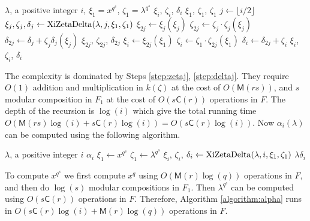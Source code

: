 \documentclass[12pt]{article}
\theoremstyle{plain}
\theoremstyle{definition}
\def\MM{\ensuremath{\mathsf{M}}}
\def\CC{\ensuremath{\mathsf{C}}}
\newcounter{algorithm}
\begin{document}
\begin{algorithm}
	\label{algorithm:xizetadelta}
	\begin{algorithmic}[1]
		\REQUIRE $\lambda$, a positive integer $i$, $\xi_1=x^{q^s}$, $\zeta_1=\lambda^{q^s}$
		\ENSURE $\xi_i$, $\zeta_i$, $\delta_i$
		\RETURN $\xi_1$, $\zeta_1$, $\zeta_1$
		\ENDIF
		\STATE $j \leftarrow \lfloor i/2\rfloor$
		\STATE $\xi_{j},\zeta_{j},\delta_j \leftarrow {\rm XiZetaDelta}(\lambda,j,\xi_1,\zeta_1)$ 
		\STATE $\xi_{2j} \leftarrow \xi_j(\xi_j)$
		\STATE\label{step:zetaj} $\zeta_{2j} \leftarrow \zeta_j\cdot \zeta_j(\xi_j)$
		\STATE\label{step:deltaj} $\delta_{2j}\leftarrow \delta_j+\zeta_j \delta_j(\xi_j)$
		\RETURN $\xi_{2j}$, $\zeta_{2j}$, $\delta_{2j}$
		\ENDIF
		\STATE $\xi_i \leftarrow \xi_{2j}(\xi_1)$
		\STATE $\zeta_i \leftarrow \zeta_1\cdot \zeta_{2j}(\xi_1)$
		\STATE $\delta_i \leftarrow \delta_{2j}+\zeta_i$
		\RETURN $\xi_i$, $\zeta_i$, $\delta_i$
	\end{algorithmic}
\end{algorithm}
The complexity is dominated by Steps \ref{step:zetaj}, \ref{step:deltaj}. They require $O(1)$ 
addition and multiplication in $k(\zeta)$ at the cost of $O(\MM(rs))$, and $s$ modular 
composition in $F_1$ at the cost of $O(s\CC(r))$ operations in $F$. The depth of the recursion is 
$\log(i)$ which give the total running time $O(\MM(rs)\log(i) + s\CC(r)\log(i)) = 
O(s\CC(r)\log(i))$. Now $\alpha_i(\lambda)$ can be computed using the following algorithm.

\begin{algorithm}
	\label{algorithm:alpha}
	\begin{algorithmic}[1]
		\REQUIRE $\lambda$, a positive integer $i$
		\ENSURE $\alpha_i$
		\STATE $\xi_1 \leftarrow x^{q^s}$
		\STATE $\zeta_1 \leftarrow \lambda^{q^s}$
		\STATE $\xi_i$, $\zeta_i$, $\delta_i \leftarrow {\rm XiZetaDelta}(\lambda,i,\xi_1,\zeta_1)$ 
		\RETURN $\lambda \delta_i$
	\end{algorithmic}
\end{algorithm}
To compute $x^{q^s}$ we first compute $x^q$ using $O(\MM(r)\log(q))$ operations in $F$, and then do 
$\log(s)$ modular compositions in $F_1$. Then $\lambda^{q^s}$ can be computed using $O(s\CC(r))$ 
operations in $F$. Therefore, Algorithm \ref{algorithm:alpha} runs in $O(s\CC(r)\log(i) + 
\MM(r)\log(q))$ operations in $F$.
\end{document}
